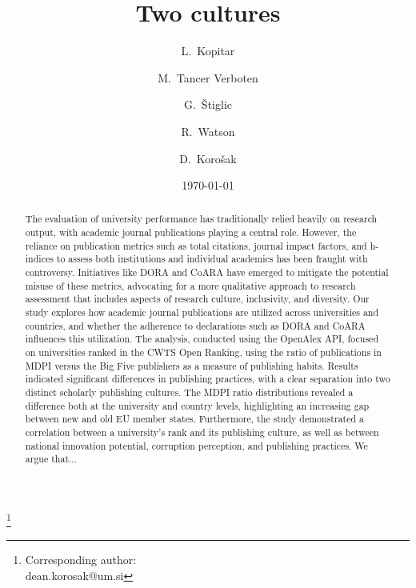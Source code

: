 \documentclass[amsfonts, amssymb, prl, superscriptaddress, notitlepage, twocolumn, nofootinbib]{revtex4-2}
\begin{document}
\title{Two cultures}
\author{L.~Kopitar }

\author{M.~Tancer Verboten}

\author{G.~Štiglic }

\author{R.~Watson }

\author{D.~Korošak  }
\thanks{Corresponding author:\\dean.korosak@um.si}





\date{\today}

\begin{abstract}
The evaluation of university performance has traditionally relied heavily on research output, with academic journal publications playing a central role. However, the reliance on publication metrics such as total citations, journal impact factors, and h-indices to assess both institutions and individual academics has been fraught with controversy. Initiatives like DORA and CoARA have emerged to mitigate the potential misuse of these metrics, advocating for a more qualitative approach to research assessment that includes aspects of research culture, inclusivity, and diversity. Our study explores how academic journal publications are utilized across universities and countries, and whether the adherence to declarations such as DORA and CoARA influences this utilization. The analysis, conducted using the OpenAlex API, focused on universities ranked in the CWTS Open Ranking, using the ratio of publications in MDPI versus the Big Five publishers as a measure of publishing habits. Results indicated significant differences in publishing practices, with a clear separation into two distinct scholarly publishing cultures. The MDPI ratio distributions revealed a difference both at the university and country levels, highlighting an increasing gap between new and old EU member states. Furthermore, the study demonstrated a correlation between a university's rank and its publishing culture, as well as between national innovation potential, corruption perception, and publishing practices. We argue that...
\end{abstract}
\end{document}
